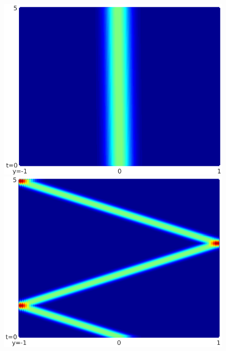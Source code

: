 \documentclass[10pt]{article}
\begin{document}
\begin{figure}[!h]
	\centering 
	\begin{minipage}{0.3\textwidth}
		\includegraphics[scale=0.37]{./figures/plot_frac_schrodinger2_01_1}
	\end{minipage}
	\hspace{0.2cm}	
	\begin{minipage}{0.3\textwidth}
		\includegraphics[scale=0.37]{./figures/plot_frac_schrodinger2_05_1}
	\end{minipage}	
	\hspace{0.2cm}	
	\begin{minipage}{0.3\textwidth}

\end{minipage}
\end{figure}
\end{document}
